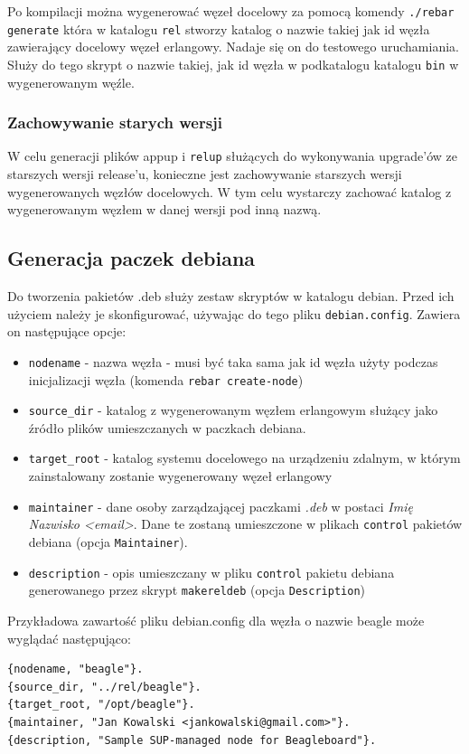\documentclass[polish,12pt]{aghthesis}
\begin{document}
Po kompilacji można wygenerować węzeł docelowy za pomocą komendy \texttt{./rebar generate} która w katalogu \texttt{rel} stworzy katalog o nazwie takiej jak id węzła zawierający docelowy węzeł erlangowy. Nadaje się on do testowego uruchamiania. Służy do tego skrypt o nazwie takiej, jak id węzła w podkatalogu katalogu \texttt{bin} w wygenerowanym węźle.

\subsubsection{Zachowywanie starych wersji}

W celu generacji plików appup i \texttt{relup} służących do wykonywania upgrade'ów ze starszych wersji release'u, konieczne jest zachowywanie starszych wersji wygenerowanych węzłów docelowych. W tym celu wystarczy zachować katalog z wygenerowanym węzłem w danej wersji pod inną nazwą.

\subsection{Generacja paczek debiana}
Do tworzenia pakietów .deb służy zestaw skryptów w katalogu debian. Przed ich użyciem należy je skonfigurować, używając do tego pliku \texttt{debian.config}. Zawiera on następujące opcje:
\begin{itemize}
\item \texttt{nodename} - nazwa węzła - musi być taka sama jak id węzła użyty podczas inicjalizacji węzła (komenda \texttt{rebar create-node})
\item \texttt{source\_dir} - katalog z wygenerowanym węzłem erlangowym służący jako źródło plików umieszczanych w paczkach debiana.
\item \texttt{target\_root} - katalog systemu docelowego na urządzeniu zdalnym, w którym zainstalowany zostanie wygenerowany węzeł erlangowy
\item \texttt{maintainer} - dane osoby zarządzającej paczkami \emph{.deb} w postaci \emph{Imię Nazwisko <email>}. Dane te zostaną umieszczone w plikach \texttt{control} pakietów debiana (opcja \texttt{Maintainer}).
\item \texttt{description} - opis umieszczany w pliku \texttt{control} pakietu debiana generowanego przez skrypt \texttt{makereldeb} (opcja \texttt{Description})
\end{itemize}
Przykładowa zawartość pliku debian.config dla węzła o nazwie beagle może wyglądać następująco:
\begin{lstlisting}
{nodename, "beagle"}.
{source_dir, "../rel/beagle"}.
{target_root, "/opt/beagle"}.
{maintainer, "Jan Kowalski <jankowalski@gmail.com>"}.
{description, "Sample SUP-managed node for Beagleboard"}.
\end{lstlisting}
\end{document}
